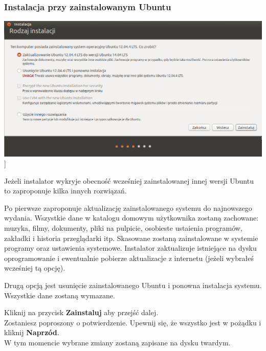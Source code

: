 \subsubsection{Instalacja przy zainstalowanym Ubuntu}
\begin{center}
	\includegraphics[scale=0.5]{images/instalator_partycjonowanie_obok_ubuntu.png}]
\end{center}
Jeżeli instalator wykryje obecność wcześniej zainstalowanej innej wersji Ubuntu to zaproponuje kilka innych rozwiązań.

Po pierwsze zaproponuje aktualizację zainstalowanego systemu do najnowszego wydania. Wszystkie dane w katalogu domowym użytkownika zostaną zachowane: muzyka, filmy, dokumenty, pliki na pulpicie, osobieste ustaienia programów, zakładki i historia przeglądarki itp.
Skasowane zostaną zainstalowane w systemie programy oraz ustawienia systemowe. Instalator zaktualizuje istniejące na dysku oprogramowanie i ewentualnie pobierze aktualizacje z internetu (jeżeli wybrałeś wcześniej tą opcję).

Drugą opcją jest usunięcie zainstalowanego Ubuntu i ponowna instalacja systemu. Wszystkie dane zostaną wymazane.
\begin{flushright}
Kliknij na przycisk \textbf{Zainstaluj} aby przejść dalej.\\
Zostaniesz poproszony o potwierdzenie. Upewnij się, że wszystko jest w pożądku i kliknij \textbf{Naprzód}.\\
W tym momencie wybrane zmiany zostaną zapisane na dysku twardym.
\end{flushright}
\clearpage

